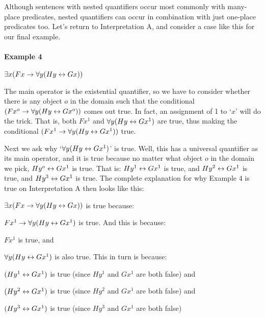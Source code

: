 Although sentences with nested quantifiers occur most commonly with many-place predicates, nested quantifiers can occur in combination with just one-place predicates too.  Let's return to Interpretation A, and consider a case like this for our final example.

\paragraph{Example 4} $\exists x(Fx \rightarrow \forall y(Hy \leftrightarrow Gx))$

\noindent The main operator is the existential quantifier, so we have to consider whether there is any object $o$ in the domain such that the conditional $(Fx^o \rightarrow \forall y(Hy \leftrightarrow Gx^o))$ comes out true.  In fact, an assignment of 1 to `$x$' will do the trick.  That is, both $Fx^1$ and $\forall y(Hy \leftrightarrow Gx^1)$ are true, thus making the conditional $(Fx^1 \rightarrow \forall y(Hy \leftrightarrow Gx^1))$ true.

Next we ask why `$\forall y(Hy \leftrightarrow Gx^1)$'  is true.  Well, this  has a universal quantifier as its main operator, and it is true because  no matter what object $o$  in the domain we pick, $Hy^o \leftrightarrow Gx^1$ is true.  That is:  $Hy^1 \leftrightarrow Gx^1$ is true, and $Hy^2 \leftrightarrow Gx^1$ is true, and $Hy^3 \leftrightarrow Gx^1$ is true. The complete explanation for why Example 4 is true on Interpretation A then looks like this:


\begin{etriangle}
\item $\exists x(Fx \rightarrow \forall y(Hy \leftrightarrow Gx))$ is true because:
\begin{etriangle}
\item $Fx^1 \rightarrow \forall y(Hy \leftrightarrow Gx^1)$ is true.  And this is because:
\begin{etriangle}
\item $Fx^1$ is true, and
\item $\forall y(Hy \leftrightarrow Gx^1)$ is also true. This in turn is because:
\begin{etriangle}
\item $(Hy^1 \leftrightarrow Gx^1)$ is true (since $Hy^1$ and $Gx^1$ are both false) and
\item $(Hy^2 \leftrightarrow Gx^1)$ is true (since $Hy^2$ and $Gx^1$ are both false) and
\item $(Hy^3 \leftrightarrow Gx^1)$ is true (since $Hy^3$ and $Gx^1$ are both false)
\end{etriangle}
\end{etriangle}
\end{etriangle}
\end{etriangle}


